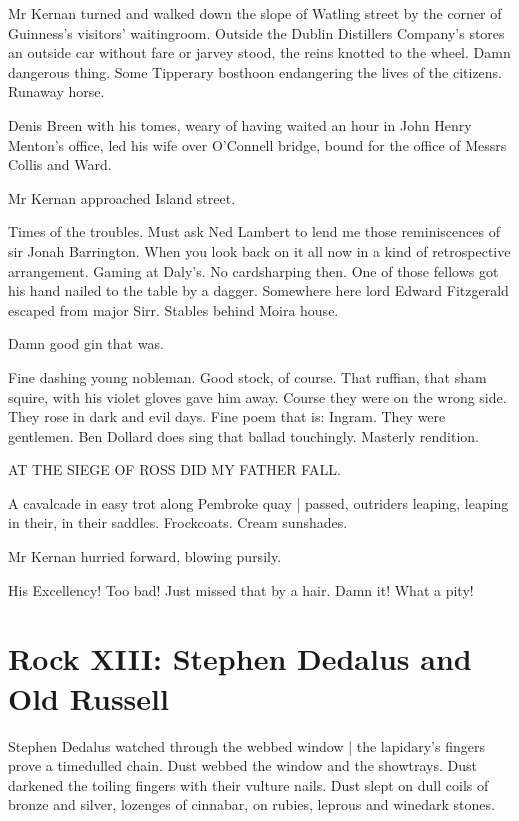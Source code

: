 Mr Kernan turned and walked down the slope of Watling street
by the
corner of Guinness's visitors' waitingroom.
Outside the Dublin Distillers
Company's stores
an outside car without fare or jarvey stood,
the reins
knotted to the wheel.
Damn dangerous thing.
Some Tipperary bosthoon
endangering the lives of the citizens.
Runaway horse.

Denis Breen with his tomes,
weary of having waited an hour in John Henry Menton's office,
led his wife over O'Connell bridge,
bound for the office
of Messrs Collis and Ward.

Mr Kernan approached Island street.

Times of the troubles.
Must ask Ned Lambert to lend me
those
reminiscences of sir Jonah Barrington.
When you look back on it all now
in a kind of retrospective arrangement.
Gaming at Daly's.
No cardsharping
then.
One of those fellows got his hand nailed to the table by a dagger.
Somewhere here lord Edward Fitzgerald escaped from major Sirr.
Stables
behind Moira house.

Damn good gin that was.

Fine dashing young nobleman.
Good stock, of course.
That ruffian, that sham squire, with his violet gloves
gave him away.
Course they were on the wrong side.
They rose in dark and evil days.
Fine poem that is:
Ingram.
They were gentlemen.
Ben Dollard does sing that ballad touchingly.
Masterly rendition.


    AT THE SIEGE OF ROSS DID MY FATHER FALL.


A cavalcade in easy trot along Pembroke quay |
passed,
outriders leaping, leaping in their, in their saddles.
Frockcoats.
Cream sunshades.

Mr Kernan hurried forward,
blowing pursily.

His Excellency!
Too bad!
Just missed that by a hair.
Damn it!
What a pity!


\section*{Rock XIII: Stephen Dedalus and Old Russell}


Stephen Dedalus watched through the webbed window |
the lapidary's fingers prove a timedulled chain.
Dust webbed the window and the showtrays.
Dust darkened the toiling fingers with their vulture nails.
Dust slept on dull coils of bronze and silver,
lozenges of cinnabar,
on rubies,
leprous and winedark stones.

